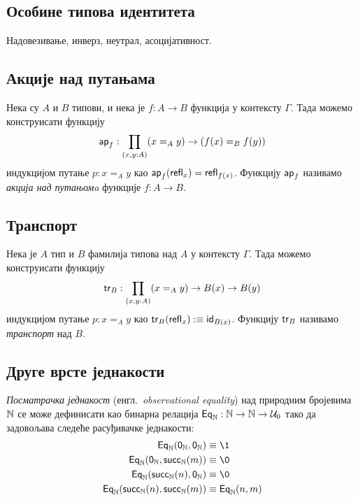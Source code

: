 \documentclass[12pt,oneside]{memoir}
\begin{document}
\subsection{Особине типова идентитета}
    
Надовезивање, инверз, неутрал, асоцијативност.

\subsection{Акције над путањама}

\begin{definition}
    Нека су $A$ и $B$ типови, и нека је $f : A \to B$ функција у контексту $\Gamma$. Тада можемо конструисати функцију 
    \[\mathsf{ap}_{f} : \prod_{(x,y:A)} (x =_{A} y) \to (f (x) =_{B} f (y))\]
    индукцијом путање $p : x =_{A} y$ као $\mathsf{ap}_{f} (\mathsf{refl}_{x}) = \mathsf{refl}_{f(x)}$. Функцију $\mathsf{ap}_{f}$ називамо \emph{акција над путањомa} функције $f : A \to B$.
\end{definition}

\subsection{Транспорт}

\begin{definition}
    Нека је $A$ тип и $B$ фамилија типова над $A$ у контексту $\Gamma$. Тада можемо конструисати функцију
    \[\mathsf{tr}_{B} : \prod_{(x,y:A)} (x =_{A} y) \to B(x) \to B(y)\]
    индукцијом путање $p : x =_{A} y$ као $\mathsf{tr}_{B}(\mathsf{refl}_{x}) :\equiv \mathsf{id}_{B(x)}$.
Функцију $\mathsf{tr}_{B}$ називамо \emph{транспорт} над $B$.
\
\end{definition}

\subsection{Друге врсте једнакости}

\begin{definition}
    {\color{red}\emph{Посматрачка једнакост}} (енгл.~\emph{observational equality}) над природним бројевима ${\mathbb{N}}$ се може дефинисати као бинарна релација $\mathsf{Eq}_{{\mathbb{N}}} : {\mathbb{N}} \to {\mathbb{N}} \to \mathcal{U}_0$ тако да задовољава следеће расуђивачке једнакости:
    \begin{align*}
        \Eq{\N} (\zeroN, \zeroN) &\equiv\1 \\
        \Eq{\N} (\zeroN, \succN(m)) &\equiv\0 \\
        \Eq{\N} (\succN(n), \zeroN) &\equiv\0 \\
        \Eq{\N} (\succN(n), \succN(m)) &\equiv\Eq{\N} (n, m) \\
    \end{align*}
\end{definition}
\end{document}

